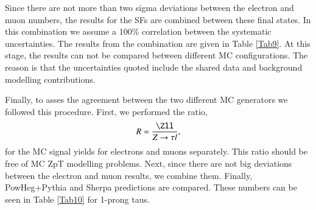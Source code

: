 Since there are not more than two sigma deviations between the electron and muon numbers, the results for the SFs are combined between these final states. In this combination we assume a 100$\%$ correlation between the systematic uncertainties. The results from the combination are given in Table \ref{Tab9}. At this stage, the results can not be compared between different MC configurations. The reason is that the uncertainties quoted include the shared data and background modelling contributions.
\begin{table}[h]
\end{table} 

Finally, to asses the agreement between the two different MC generators we followed this procedure. First, we performed the ratio,
\begin{equation}
R=\frac{\Zll}{Z\to\tau l},
\end{equation}
for the MC signal yields for electrons and muons separately. This ratio should be free of MC ZpT modelling problems. Next, since there are not big deviations between the electron and muon results, we combine them. Finally,  PowHeg+Pythia and Sherpa predictions are compared. These numbers can be seen in Table \ref{Tab10} for 1-prong taus.

